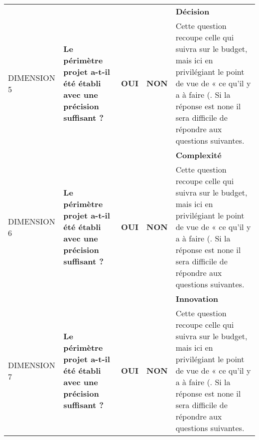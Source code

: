 \documentclass[12pt]{article}
\begin{document}
\begin{landscape}
\begin{table}[H]
\begin{tabular}{p{2.25cm}p{}p{1cm}p{1cm}p{12.25cm}}
\hline \cellcolor{green!75}& \cellcolor{green!75}& \cellcolor{green!75}& \cellcolor{green!75}&\bf Décision \cellcolor{green!75}\\
DIMENSION 5\cellcolor{green!75} & \bf Le périmètre projet a-t-il été établi avec une précision suffisant ? & \bf OUI \cellcolor{green!50}& \bf NON\cellcolor{red!50} & Cette question recoupe celle qui suivra sur le budget, mais ici en privilégiant le point de vue de « ce qu’il y a à faire (. Si la réponse est none il sera difficile de répondre aux questions suivantes. \\
\hline \cellcolor{blue!50}& \cellcolor{blue!50}& \cellcolor{blue!50}& \cellcolor{blue!50}&\bf Complexité \cellcolor{blue!50}\\
DIMENSION 6\cellcolor{blue!50} & \bf Le périmètre projet a-t-il été établi avec une précision suffisant ? & \bf OUI \cellcolor{green!50}& \bf NON\cellcolor{red!50} & Cette question recoupe celle qui suivra sur le budget, mais ici en privilégiant le point de vue de « ce qu’il y a à faire (. Si la réponse est none il sera difficile de répondre aux questions suivantes. \\
\hline \cellcolor{blue!70}& \cellcolor{blue!70}& \cellcolor{blue!70}& \cellcolor{blue!70}&\bf Innovation \cellcolor{blue!70}\\
DIMENSION 7\cellcolor{blue!70} & \bf Le périmètre projet a-t-il été établi avec une précision suffisant ? & \bf OUI \cellcolor{green!50}& \bf NON\cellcolor{red!50} & Cette question recoupe celle qui suivra sur le budget, mais ici en privilégiant le point de vue de « ce qu’il y a à faire (. Si la réponse est none il sera difficile de répondre aux questions suivantes. \\



\hline
\end{tabular}
\label{identifier_les_risques}
\end{table}
\end{landscape}


\end{document}
